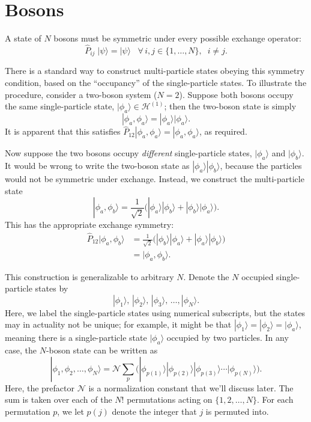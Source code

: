 \documentclass[pra,12pt]{revtex4}
\begin{document}
\section{Bosons}

A state of $N$ bosons must be symmetric under every possible exchange
operator:
$$\hat{P}_{ij}\; |\psi\rangle = |\psi\rangle \;\;\; \forall\, i, j \in\{1,\dots,N\},\;\; i\ne j.$$

There is a standard way to construct multi-particle states obeying
this symmetry condition, based on the ``occupancy'' of the
single-particle states.  To illustrate the procedure, consider a
two-boson system ($N = 2$).  Suppose both bosons occupy the same
single-particle state, $|\phi_a\rangle \in \mathscr{H}^{(1)}$; then
the two-boson state is simply
$$|\phi_a,\phi_a\rangle = |\phi_a\rangle  |\phi_a\rangle.$$
It is apparent that this satisfies $\hat{P}_{12}
|\phi_a,\phi_a\rangle = |\phi_a,\phi_a\rangle$, as required.

Now suppose the two bosons occupy \textit{different} single-particle
states, $|\phi_a\rangle$ and $|\phi_b\rangle$.  It would be wrong to
write the two-boson state as $|\phi_a\rangle |\phi_b\rangle$, because
the particles would not be symmetric under exchange.  Instead, we
construct the multi-particle state
$$|\phi_a,\phi_b\rangle = \frac{1}{\sqrt{2}} \Big( |\phi_a\rangle  |\phi_b\rangle + |\phi_b\rangle  |\phi_a\rangle\Big).$$
This has the appropriate exchange symmetry:
$$\begin{aligned}\hat{P}_{12}|\phi_a,\phi_b\rangle &= \frac{1}{\sqrt{2}} \Big( |\phi_b\rangle  |\phi_a\rangle + |\phi_a\rangle  |\phi_b\rangle\Big) \\ &= |\phi_a,\phi_b\rangle.\end{aligned}$$

This construction is generalizable to arbitrary $N$.  Denote the $N$
occupied single-particle states by
$$|\phi_1\rangle, \, |\phi_2\rangle, \, |\phi_3\rangle, \, \dots, |\phi_N\rangle.$$
Here, we label the single-particle states using numerical subscripts,
but the states may in actuality not be unique; for example, it might
be that $|\phi_1\rangle = |\phi_2\rangle = |\phi_a\rangle$, meaning
there is a single-particle state $|\phi_a\rangle$ occupied by two
particles.  In any case, the $N$-boson state can be written as
$$|\phi_1,\phi_2,\dots,\phi_N\rangle = \mathcal{N} \sum_p \Big(|\phi_{p(1)}\rangle  |\phi_{p(2)}\rangle  |\phi_{p(3)}\rangle  \cdots  |\phi_{p(N)}\rangle\Big).$$
Here, the prefactor $\mathcal{N}$ is a normalization constant that
we'll discuss later.  The sum is taken over each of the $N!$
permutations acting on $\{1,2,\dots,N\}$.  For each permutation $p$,
we let $p(j)$ denote the integer that $j$ is permuted into.
\end{document}
